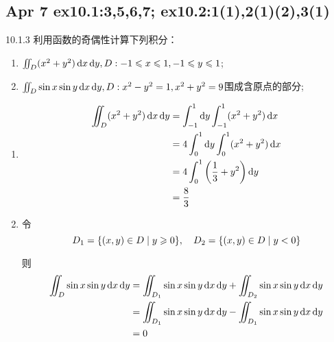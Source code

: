 \setcounter{chapter}{7} %
\chapter{}

\section{Apr  7 ex10.1:3,5,6,7; ex10.2:1(1),2(1)(2),3(1)}

\begin{exercise}{10.1.3}
    利用函数的奇偶性计算下列积分：
    \begin{enumerate}
        \item $\iint_D (x^2+y^2) \operatorname{d\!} x \operatorname{d\!} y, D: -1 \leqslant x \leqslant 1, -1 \leqslant y \leqslant 1$;
        \item $\iint_D \sin x \sin y \operatorname{d\!} x \operatorname{d\!} y, D: x^2 - y^2 = 1,x^2+y^2=9$围成含原点的部分;
    \end{enumerate}
    
\end{exercise}

\begin{solution}
    \begin{enumerate}
        \item \begin{align*}
            \iint_D (x^2 + y^2) \operatorname{d\!} x \operatorname{d\!} y 
            &= \int_{-1}^1 \operatorname{d\!} y \int_{-1}^1 (x^2 + y^2) \operatorname{d\!} x \\
            &= 4 \int_0^1 \operatorname{d\!} y \int_0^1 (x^2 + y^2) \operatorname{d\!} x \\
            &= 4 \int_0^1 \left( \frac{1}{3} + y^2 \right) \operatorname{d\!} y \\
            &= \frac{8}{3}
            \end{align*}
        \item 令
        \[
        D_1 = \{ (x, y) \in D \mid y \geqslant 0 \}, \quad
        D_2 = \{ (x, y) \in D \mid y < 0 \}
        \]
        
        则
        \begin{align*}
        \iint_D \sin x \sin y \dif x \dif y 
        &= \iint_{D_1} \sin x \sin y \dif x \dif y + \iint_{D_2} \sin x \sin y \dif x \dif y \\
        &= \iint_{D_1} \sin x \sin y \dif x \dif y - \iint_{D_1} \sin x \sin y \dif x \dif y \\
        &= 0
        \end{align*}
    \end{enumerate}
\end{solution}

